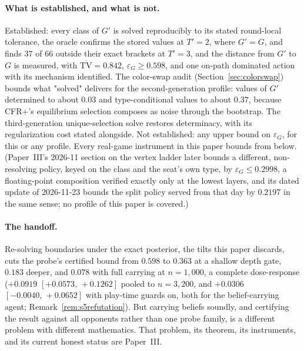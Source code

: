 \documentclass[11pt]{article}
\theoremstyle{plain}
\theoremstyle{definition}
\theoremstyle{remark}
\newcommand{\game}{\ensuremath{G}}
\newcommand{\gp}{\ensuremath{G'}}
\newcommand{\epsG}{\ensuremath{\varepsilon_{\game}}}
\begin{document}
\paragraph{What is established, and what is not.} Established: every class
of $\gp$ is solved reproducibly to its stated round-local tolerance, the
oracle confirms the stored values at $T'=2$, where $\gp=\game$, and finds
$37$ of $66$ outside their exact brackets at $T'=3$, and the distance from
$\gp$ to $\game$ is
measured, with $\overline{\mathrm{TV}}=0.842$, $\epsG\ge0.598$, and one
on-path dominated action with its mechanism identified. The color-swap
audit (Section~\ref{sec:colorswap}) bounds what "solved" delivers for
the second-generation profile: values of $\gp$ determined to about
$0.03$ and type-conditional values to about $0.37$, because CFR+'s
equilibrium selection composes as noise through the bootstrap. The
third-generation unique-selection solve restores determinacy, with its
regularization cost stated alongside. Not established: any upper bound
on $\epsG$, for this or any profile. Every real-game instrument in this paper
bounds from below. (Paper~III's 2026-11 section on the vertex ladder later
bounds a different, non-resolving policy, keyed on the class and the seat's
own type, by $\epsG\le0.2998$, a floating-point composition verified exactly
only at the lowest layers, and its dated update of 2026-11-23 bounds
the split policy served from that day by $0.2197$ in the same sense; no
profile of this paper is covered.)

\paragraph{The handoff.} Re-solving boundaries under the exact posterior, the
tilts this paper discards, cuts the probe's certified bound from $0.598$ to
$0.363$ at a shallow depth gate, $0.183$ deeper, and $0.078$ with full
carrying at $n=1{,}000$, a complete dose-response ($+0.0919$
$[+0.0573,\,+0.1262]$ pooled to $n=3{,}200$, and $+0.0306$
$[-0.0040,\,+0.0652]$ with play-time guards on, both for the
belief-carrying agent; Remark~\ref{rem:s5refutation}). But carrying beliefs soundly, and certifying
the result against all opponents rather than one probe family, is a different
problem with different mathematics. That problem, its theorem, its instruments,
and its current honest status are Paper~III.
\end{document}
